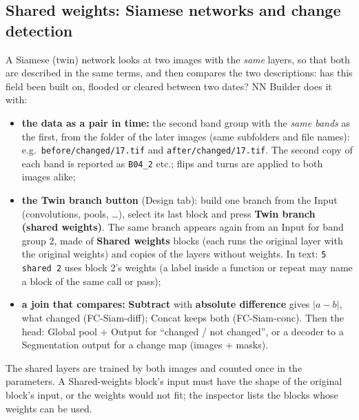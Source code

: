 \documentclass[11pt,a4paper]{article}
\newcommand{\ui}[1]{\textbf{\textsf{#1}}}
\newcommand{\file}[1]{\texttt{#1}}
\begin{document}
\subsection{Shared weights: Siamese networks and change detection}
\label{sec:siamese}
A Siamese (twin) network looks at two images with the \emph{same} layers, so that both are described in the same terms, and then
compares the two descriptions: has this field been built on, flooded or cleared between two dates? NN Builder does it with:
\begin{itemize}[nosep]
  \item \textbf{the data as a pair in time:} the second band group with the \emph{same bands} as the first, from the folder of the later
        images (same subfolders and file names): e.g.\ \file{before/changed/17.tif} and \file{after/changed/17.tif}. The second copy of
        each band is reported as \texttt{B04\_2} etc.; flips and turns are applied to both images alike;
  \item \textbf{the Twin branch button} (Design tab): build one branch from the Input (convolutions, pools, \dots), select its last block and
        press \ui{Twin branch (shared weights)}. The same branch appears again from an Input for band group 2, made of \ui{Shared
        weights} blocks (each runs the original layer with the original weights) and copies of the layers without weights. In text:
        \texttt{5 shared 2} uses block 2's weights (a label inside a function or repeat may name a block of the same call or pass);
  \item \textbf{a join that compares:} \ui{Subtract} with \ui{absolute difference} gives $|a-b|$, what changed (FC-Siam-diff); Concat keeps
        both (FC-Siam-conc). Then the head: Global pool + Output for ``changed / not changed'', or a decoder to a Segmentation output for a
        change map (images + masks).
\end{itemize}
The shared layers are trained by both images and counted once in the parameters. A Shared-weights block's input must have the shape of
the original block's input, or the weights would not fit; the inspector lists the blocks whose weights can be used.
\end{document}
